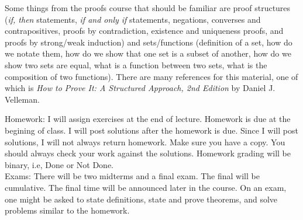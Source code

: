 \documentclass{article}
\begin{document}
	Some things from the proofs course that should be familiar are proof structures  (\textit{if, then} statements, \textit{if and only if} statements, negations, converses and contrapositives, proofs by contradiction, existence and uniqueness proofs, and proofs by strong/weak induction) and sets/functions  (definition of a set, how do we notate them, how do we show that one set is a subset of another, how do we show two sets are equal, what is a function between two sets, what is the composition of two functions). There are many references for this material, one of which is \textit{How to Prove It: A Structured Approach, 2nd Edition} by Daniel J. Velleman. \\
	\begin{comment}\begin{enumerate} \item proof structures \begin{itemize}\item if, then \item if and only if \item converse, contrapositive \item contradiction \item existence and uniqueness \item induction\end{itemize} \item \begin{itemize} \item what are sets, and how do we notate them? \item how to show that one set is a subset of another set \item how to show two sets are equal \item what is a function between two abstract sets? \item composition of functions? \end{itemize}\end{enumerate}\end{comment}
	
	Homework: I will assign exercises at the end of lecture. Homework is due at the begining of class. I will post solutions after the homework is due. Since I will post solutions, I will not always return homework.  Make sure you have a copy. You should always check your work against the solutions. Homework grading will be binary, i.e, Done or Not Done. \\
	
	Exams: There will be two midterms and a final exam. The final will be cumulative. The final time will be announced later in the course. On an exam, one might be asked to state definitions, state and prove theorems, and solve problems similar to the homework.\\
	
\end{document}
